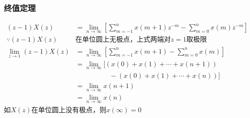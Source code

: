 \documentclass[notheorems,compress,mathserif,table]{beamer}
\begin{document}
\begin{frame}[shrink]\frametitle{终值定理}%
%
\vspace{-0.5cm}
\begin{equation*}
\begin{split}
(z-1)X(z) &= \lim_{n\rightarrow \infty}\left[\sum_{m=-1}^{n}x(m+1)z^{-m}- \sum_{m=0}^{n}x(m)z^{-m}\right]\\
\because (z-1)X(z)       &\mbox{在单位圆上无极点，上式两端对$z=1$取极限}\\
\lim_{z\rightarrow 1}(z-1)X(z)
&= \lim_{n\rightarrow \infty}\left[\sum_{m=-1}^{n}x(m+1)- \sum_{m=0}^{n}x(m)\right]\\
&= \lim_{n\rightarrow \infty} \big[(x(0)+x(1)+\cdots +x(n+1))\\
&\quad  \qquad\qquad-(x(0)+x(1) + \cdots +x(n))\big] \\
&= \lim_{n\rightarrow \infty}x(n+1)\\
&= \lim_{n\rightarrow \infty}x(n)
\end{split}
\end{equation*}
如$X(z)$在单位圆上没有极点，则$x(\infty)=0$

\end{frame}
\end{document}
